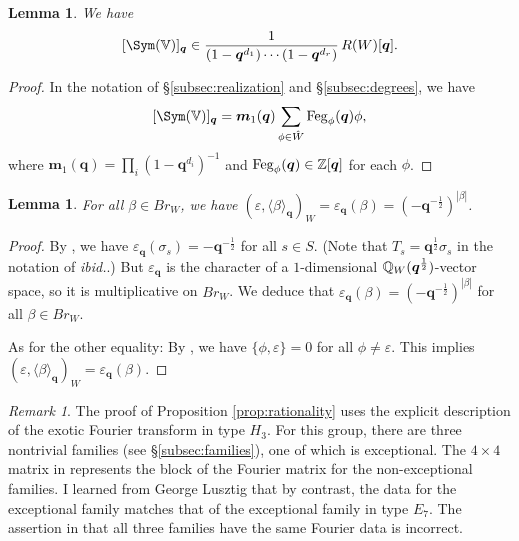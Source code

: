 \documentclass[a4paper,10pt,leqno]{amsart}
\theoremstyle{plain}
\theoremstyle{plain}
\theoremstyle{plain}
\newtheorem{lem}[thm]{Lemma}
\theoremstyle{definition}
\theoremstyle{remark}
\newtheorem{rem}[thm]{Remark}
\newcommand{\Br}{\mathit{Br}}
\newcommand{\Q}{\bm{q}}
\newcommand{\FDeg}{\mathrm{Feg}}
\newcommand{\Tr}[1]{\langle{#1}\rangle_{\Q}}
\begin{document}
\begin{lem}
We have 
\begin{align}
{[\Sym(\bb{V})]_{\Q}} \in \frac{1}{(1 - \Q^{d_1}) \cdots (1 - \Q^{d_r})}\, R(W)[\Q].
\end{align}
\end{lem}

\begin{proof}
In the notation of \S\ref{subsec:realization} and \S\ref{subsec:degrees}, we have 
\begin{align}
{[\Sym(\bb{V})]_{\Q}} 
= \bm{m}_1(\Q)\sum_{\phi \in \hat{W}} {\FDeg_\phi(\Q)\phi},
\end{align}
where $\bm{m}_1(\Q) = \prod_i {(1 - \Q^{d_i})^{-1}}$ and $\FDeg_\phi(\Q) \in \bb{Z}[\Q]$ for each $\phi$.
\end{proof}

\begin{lem}
For all $\beta \in \Br_W$, we have $(\varepsilon, \Tr{\beta})_W = \varepsilon_{\Q}(\beta) = (-\Q^{-\frac{1}{2}})^{|\beta|}$.
\end{lem}

\begin{proof}
By \cite[252]{gp}, we have $\varepsilon_{\Q}(\sigma_s) = -\Q^{-\frac{1}{2}}$ for all $s \in S$.
(Note that $T_s = \Q^{\frac{1}{2}}\sigma_s$ in the notation of \emph{ibid.}.)
But $\varepsilon_{\Q}$ is the character of a $1$-dimensional $\bb{Q}_W(\Q^{\frac{1}{2}})$-vector space, so it is multiplicative on $\Br_W$.
We deduce that $\varepsilon_{\Q}(\beta) = (-\Q^{-\frac{1}{2}})^{|\beta|}$ for all $\beta \in \Br_W$.

As for the other equality:
By \cite[Ch.~4]{lusztig_1984}, we have $\{\phi, \varepsilon\} = 0$ for all $\phi \neq \varepsilon$.
This implies $(\varepsilon, \Tr{\beta})_W = \varepsilon_{\Q}(\beta)$.
\end{proof}

\begin{rem}\label{rem:h3}
The proof of Proposition \ref{prop:rationality} uses the explicit description of the exotic Fourier transform in type $H_3$.
For this group, there are three nontrivial families (see \S\ref{subsec:families}), one of which is exceptional.
The $4 \times 4$ matrix in \cite[\S{7}]{bm_1993} represents the block of the Fourier matrix for the non-exceptional families.
I learned from George Lusztig that by contrast, the data for the exceptional family matches that of the exceptional family in type $E_7$.
The assertion in \cite[189]{gm} that all three families have the same Fourier data is incorrect.
\end{rem}
\end{document}
